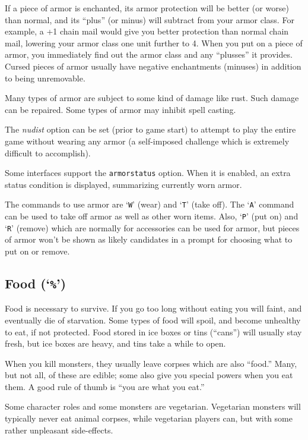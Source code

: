 \documentclass[titlepage]{article}
\begin{document}
If a piece of armor is enchanted, its armor protection will be better
(or worse) than normal, and its ``plus'' (or minus) will subtract from
your armor class.  For example, a +1 chain mail would give you
better protection than normal chain mail, lowering your armor class one
unit further to 4.  When you put on a piece of armor, you immediately
find out the armor class and any ``plusses'' it provides.  Cursed
pieces of armor usually have negative enchantments (minuses) in
addition to being unremovable.

Many types of armor are subject to some kind of damage like rust.  Such
damage can be repaired.  Some types of armor may inhibit spell casting.

The \textit{nudist}
option can be set (prior to game start) to attempt to play the entire
game without wearing any armor (a self-imposed challenge which is
extremely difficult to accomplish).

Some interfaces support the \texttt{armorstatus} option.
When it is enabled, an extra status condition is displayed, summarizing
currently worn armor.

The commands to use armor are `\texttt{W}' (wear) and `\texttt{T}' (take off).
The `\texttt{A}' command can be used to take off armor as well as other
worn items.
Also, `\texttt{P}' (put on) and `\texttt{R}' (remove) which are normally for
accessories can be used for armor, but pieces of armor won't be shown
as likely candidates in a prompt for choosing what to put on or remove.

\subsection*{Food (`\texttt{\%}')}

Food is necessary to survive.  If you go too long without eating you
will faint, and eventually die of starvation.
Some types of food will spoil, and become unhealthy to eat,
if not protected.
Food stored in ice boxes or tins (``cans'')
will usually stay fresh, but ice boxes are heavy, and tins
take a while to open.

When you kill monsters, they usually leave corpses which are also
``food.''  Many, but not all, of these are edible; some also give you
special powers when you eat them.  A good rule of thumb is ``you are
what you eat.''

Some character roles and some monsters are vegetarian.  Vegetarian monsters
will typically never eat animal corpses, while vegetarian players can,
but with some rather unpleasant side-effects.
\end{document}

